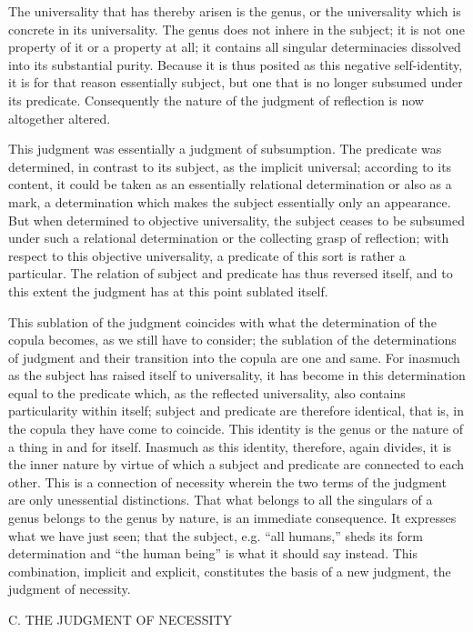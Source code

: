 The universality that has thereby arisen is the genus,
or the universality which is concrete in its universality.
The genus does not inhere in the subject;
it is not one property of it or a property at all;
it contains all singular determinacies
dissolved into its substantial purity.
Because it is thus posited as this negative self-identity,
it is for that reason essentially subject,
but one that is no longer subsumed under its predicate.
Consequently the nature of the judgment of reflection is
now altogether altered.

This judgment was essentially a judgment of subsumption.
The predicate was determined, in contrast to its subject,
as the implicit universal;
according to its content, it could be taken as an
essentially relational determination
or also as a mark,
a determination which makes the subject
essentially only an appearance.
But when determined to objective universality,
the subject ceases to be subsumed
under such a relational determination
or the collecting grasp of reflection;
with respect to this objective universality,
a predicate of this sort is rather a particular.
The relation of subject and predicate
has thus reversed itself,
and to this extent the judgment has
at this point sublated itself.

This sublation of the judgment coincides
with what the determination of the copula becomes,
as we still have to consider;
the sublation of the determinations of judgment
and their transition into the copula are one and same.
For inasmuch as the subject has raised itself to universality,
it has become in this determination equal to the predicate
which, as the reflected universality,
also contains particularity within itself;
subject and predicate are therefore identical, that is,
in the copula they have come to coincide.
This identity is the genus
or the nature of a thing in and for itself.
Inasmuch as this identity, therefore, again divides,
it is the inner nature by virtue of which
a subject and predicate are connected to each other.
This is a connection of necessity
wherein the two terms of the judgment are only
unessential distinctions.
That what belongs to all the singulars of a genus
belongs to the genus by nature,
is an immediate consequence.
It expresses what we have just seen;
that the subject, e.g. “all humans,”
sheds its form determination
and “the human being” is what it should say instead.
This combination, implicit and explicit,
constitutes the basis of a new judgment,
the judgment of necessity.

C. THE JUDGMENT OF NECESSITY

